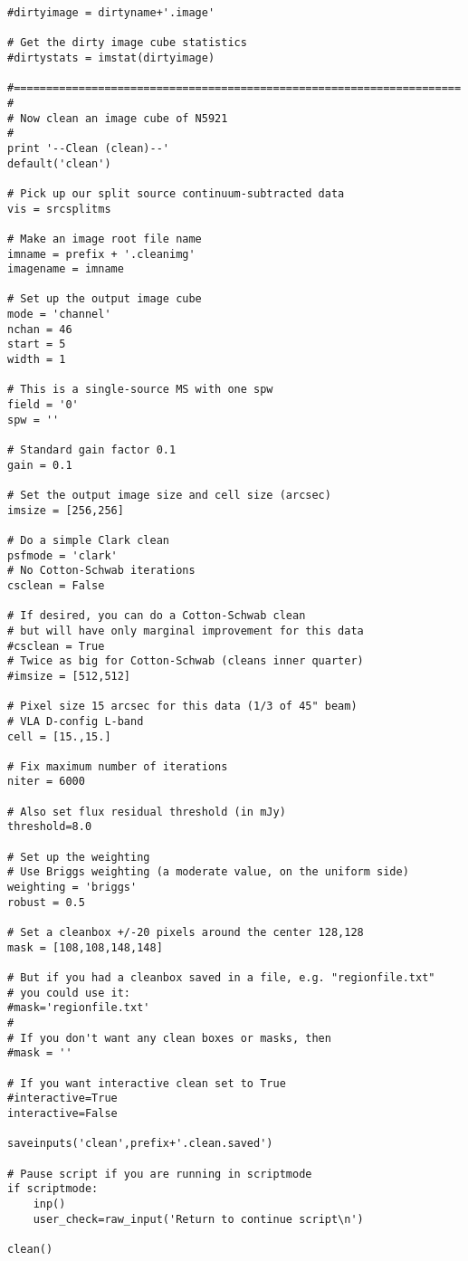\begin{verbatim}
#dirtyimage = dirtyname+'.image'
 
# Get the dirty image cube statistics
#dirtystats = imstat(dirtyimage)

#=====================================================================
#
# Now clean an image cube of N5921
#
print '--Clean (clean)--'
default('clean')

# Pick up our split source continuum-subtracted data
vis = srcsplitms

# Make an image root file name
imname = prefix + '.cleanimg'
imagename = imname

# Set up the output image cube
mode = 'channel'
nchan = 46
start = 5
width = 1

# This is a single-source MS with one spw
field = '0'
spw = ''

# Standard gain factor 0.1
gain = 0.1

# Set the output image size and cell size (arcsec)
imsize = [256,256]

# Do a simple Clark clean
psfmode = 'clark'
# No Cotton-Schwab iterations
csclean = False

# If desired, you can do a Cotton-Schwab clean
# but will have only marginal improvement for this data
#csclean = True
# Twice as big for Cotton-Schwab (cleans inner quarter)
#imsize = [512,512]

# Pixel size 15 arcsec for this data (1/3 of 45" beam)
# VLA D-config L-band
cell = [15.,15.]

# Fix maximum number of iterations
niter = 6000

# Also set flux residual threshold (in mJy)
threshold=8.0

# Set up the weighting
# Use Briggs weighting (a moderate value, on the uniform side)
weighting = 'briggs'
robust = 0.5

# Set a cleanbox +/-20 pixels around the center 128,128
mask = [108,108,148,148]

# But if you had a cleanbox saved in a file, e.g. "regionfile.txt"
# you could use it:
#mask='regionfile.txt'
#
# If you don't want any clean boxes or masks, then
#mask = ''

# If you want interactive clean set to True
#interactive=True
interactive=False

saveinputs('clean',prefix+'.clean.saved')

# Pause script if you are running in scriptmode
if scriptmode:
    inp()
    user_check=raw_input('Return to continue script\n')

clean()


\end{verbatim}
